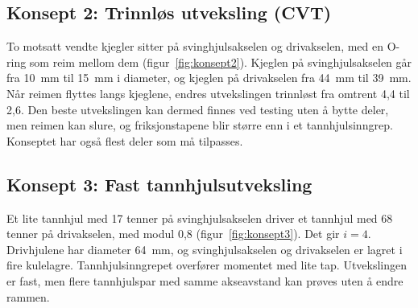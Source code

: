\subsection{Konsept 2: Trinnløs utveksling (CVT)}
To motsatt vendte kjegler sitter på svinghjulsakselen og drivakselen, med en O-ring som reim mellom dem (figur~\ref{fig:konsept2}). Kjeglen på svinghjulsakselen går fra \SI{10}{mm} til \SI{15}{mm} i diameter, og kjeglen på drivakselen fra \SI{44}{mm} til \SI{39}{mm}. Når reimen flyttes langs kjeglene, endres utvekslingen trinnløst fra omtrent 4,4 til 2,6. Den beste utvekslingen kan dermed finnes ved testing uten å bytte deler, men reimen kan slure, og friksjonstapene blir større enn i et tannhjulsinngrep. Konseptet har også flest deler som må tilpasses.

\subsection{Konsept 3: Fast tannhjulsutveksling}
Et lite tannhjul med 17 tenner på svinghjulsakselen driver et tannhjul med 68 tenner på drivakselen, med modul 0,8 (figur~\ref{fig:konsept3}). Det gir $i = 4$. Drivhjulene har diameter \SI{64}{mm}, og svinghjulsakselen og drivakselen er lagret i fire kulelagre. Tannhjulsinngrepet overfører momentet med lite tap. Utvekslingen er fast, men flere tannhjulspar med samme akseavstand kan prøves uten å endre rammen.

